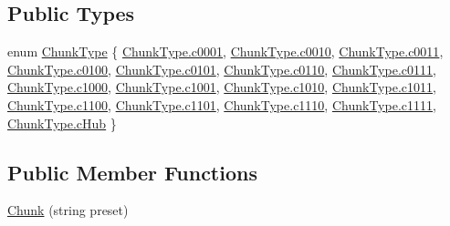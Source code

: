 \subsection*{Public Types}
\begin{DoxyCompactItemize}
\item 
enum \mbox{\hyperlink{class_chunk_ab2e9c44541a726c19e8f0afbcf82894c}{Chunk\+Type}} \{ \newline
\mbox{\hyperlink{class_chunk_ab2e9c44541a726c19e8f0afbcf82894cad16366b61839056eb843729661d7c4bf}{Chunk\+Type.\+c0001}}, 
\mbox{\hyperlink{class_chunk_ab2e9c44541a726c19e8f0afbcf82894ca31392c1d1c03cf4ebc26f94b051eba30}{Chunk\+Type.\+c0010}}, 
\mbox{\hyperlink{class_chunk_ab2e9c44541a726c19e8f0afbcf82894ca8b6c31f8ae37d9e26355dd9113529978}{Chunk\+Type.\+c0011}}, 
\mbox{\hyperlink{class_chunk_ab2e9c44541a726c19e8f0afbcf82894cad979a31b0bf551d41387db9e936ea987}{Chunk\+Type.\+c0100}}, 
\newline
\mbox{\hyperlink{class_chunk_ab2e9c44541a726c19e8f0afbcf82894ca0eb2097536ed98c61773d3420cfc13a9}{Chunk\+Type.\+c0101}}, 
\mbox{\hyperlink{class_chunk_ab2e9c44541a726c19e8f0afbcf82894cacccf67fad08c06983ddbcb801095433b}{Chunk\+Type.\+c0110}}, 
\mbox{\hyperlink{class_chunk_ab2e9c44541a726c19e8f0afbcf82894ca0b7add70855013f2cab8de094eb738f2}{Chunk\+Type.\+c0111}}, 
\mbox{\hyperlink{class_chunk_ab2e9c44541a726c19e8f0afbcf82894ca27944e9add65fd535e08566a5669e748}{Chunk\+Type.\+c1000}}, 
\newline
\mbox{\hyperlink{class_chunk_ab2e9c44541a726c19e8f0afbcf82894ca47b3dc6f399541257bd449708aa4a1a5}{Chunk\+Type.\+c1001}}, 
\mbox{\hyperlink{class_chunk_ab2e9c44541a726c19e8f0afbcf82894ca3104fc092247e39cdb6d083c8597a7c3}{Chunk\+Type.\+c1010}}, 
\mbox{\hyperlink{class_chunk_ab2e9c44541a726c19e8f0afbcf82894ca2e4f7e11c2662a54719780e95ad18195}{Chunk\+Type.\+c1011}}, 
\mbox{\hyperlink{class_chunk_ab2e9c44541a726c19e8f0afbcf82894caa1d34c2f4a030e35ba5fbc14138bcff5}{Chunk\+Type.\+c1100}}, 
\newline
\mbox{\hyperlink{class_chunk_ab2e9c44541a726c19e8f0afbcf82894ca97fbf7c43ef2f54f00291ba6540c63ea}{Chunk\+Type.\+c1101}}, 
\mbox{\hyperlink{class_chunk_ab2e9c44541a726c19e8f0afbcf82894ca3bb8f2d9511b121dda2923041d3c15c1}{Chunk\+Type.\+c1110}}, 
\mbox{\hyperlink{class_chunk_ab2e9c44541a726c19e8f0afbcf82894ca9e8ec7bc0f7942c2c9bc32bfbbd3b591}{Chunk\+Type.\+c1111}}, 
\mbox{\hyperlink{class_chunk_ab2e9c44541a726c19e8f0afbcf82894ca7c5516c9c767eb37d179548e7e42eee8}{Chunk\+Type.\+c\+Hub}}
 \}
\end{DoxyCompactItemize}
\subsection*{Public Member Functions}
\begin{DoxyCompactItemize}
\item 
\mbox{\hyperlink{class_chunk_a2cf36203919b3a5512c2dd5dc60c446b}{Chunk}} (string preset)
\end{DoxyCompactItemize}
